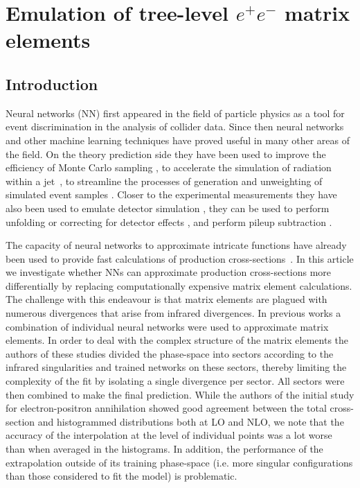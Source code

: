 \documentclass[main.tex]{subfiles}
\begin{document}
\chapter{Emulation of tree-level $e^{+}e^{-}$ matrix elements}
\label{chapter:fame1}

\section{Introduction}
\label{sec:intro}
Neural networks (NN) first appeared in the field of particle physics as a tool for event discrimination in the analysis of collider data. 
Since then neural networks and other machine learning techniques have proved useful in many other areas of the field. 
On the theory prediction side they have been used 
to improve the efficiency of Monte Carlo sampling \cite{Bendavid:2017zhk,Klimek:2018mza,Bothmann:2020ywa,Verheyen:2020bjw,Chen_2021}, 
to accelerate the simulation of radiation within a jet~\cite{Carrazza:2019cnt,Bothmann:2018trh,Dohi:2020eda}, 
to streamline the processes of generation and unweighting of simulated event samples 
\cite{Gao:2020zvv,Otten:2018kum,Hashemi:2019fkn,DiSipio:2019imz,Butter:2019cae,Bishara:2019iwh,Backes:2020vka,Butter:2020qhk,Alanazi:2020klf,Nachman:2020fff}.
Closer to the experimental measurements 
they have also been used to emulate detector simulation \cite{Paganini:2017dwg,SHiP:2019gcl,Derkach:2019qfk,Alanazi:2020jod},
 they can be used to perform unfolding \cite{Andreassen:2019cjw} or correcting for detector effects \cite{Bellagente:2019uyp},
and perform pileup subtraction \cite{Andreassen:2019cjw}. 

The capacity of neural networks to approximate intricate functions have already been 
used to provide fast calculations of production cross-sections~\cite{Otten:2018kum,Buckley:2020bxg}.
In this article we investigate whether NNs can approximate production cross-sections more differentially by replacing computationally expensive 
matrix element calculations. 
The challenge with this endeavour is that matrix elements are plagued with numerous divergences that arise from infrared divergences.
In previous works \cite{Badger:2020uow,Aylett-Bullock:2021hmo} a combination of individual neural networks were used 
to approximate matrix elements. In order to deal with the complex structure of the matrix elements 
the authors of these studies divided the phase-space into sectors according to the infrared singularities and trained networks on these sectors,
thereby limiting the complexity of the fit by isolating a single divergence per sector. All sectors were then combined to make the final prediction.
While the authors of the initial study for electron-positron annihilation showed good agreement between the total cross-section and histogrammed distributions both at LO and NLO,
we note that the accuracy of the interpolation at the level of individual points was a lot worse than when averaged in the 
histograms. In addition, the performance of the extrapolation outside of its training phase-space 
(i.e. more singular configurations than those considered to fit the model) is problematic.   
\end{document}
